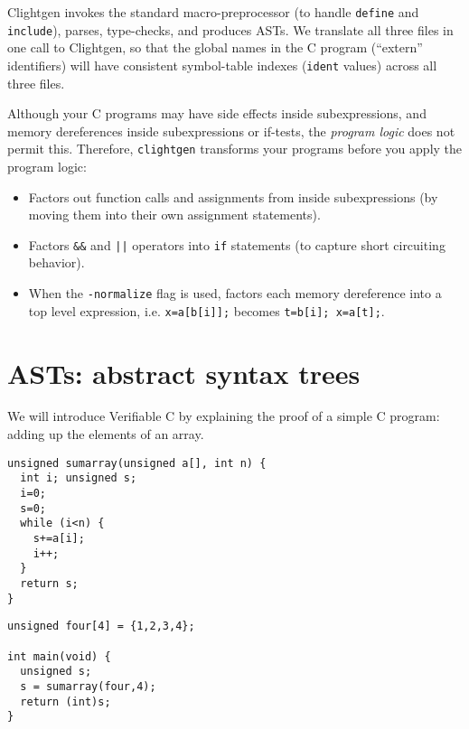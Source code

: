 \documentclass[12pt,fleqn,openany,oneside,showtrims]{memoir}
\begin{document}
Clightgen invokes the standard macro-preprocessor (to handle
\lstinline{define} and \lstinline{include}),
parses, type-checks, and produces ASTs.    We translate all
three files in one call to Clightgen, so that
the global names in the C program (``extern'' identifiers)
will have consistent symbol-table indexes (\lstinline{ident} values)
across all three files.

Although your C programs may have side effects inside subexpressions,
and memory dereferences inside subexpressions or if-tests,
the \emph{program logic} does not permit this.  Therefore,
\lstinline{clightgen} transforms your programs
before you apply the program logic:
\begin{itemize}
\item Factors out function calls and assignments from inside subexpressions (by moving them into their own assignment statements).
\item Factors \lstinline{&&} and \lstinline{||} operators
      into \lstinline{if} statements (to capture
  short circuiting behavior).
\item When the \lstinline{-normalize} flag is used,
  factors each memory dereference into a top level expression,
  i.e. \lstinline{x=a[b[i]];} becomes \lstinline{t=b[i]; x=a[t];}.
\end{itemize}







\chapter{ASTs: abstract syntax trees}

We will introduce Verifiable C by explaining the
proof of a simple C program:  adding up the elements of an array.

\begin{minipage}{2in}
\begin{lstlisting}
unsigned sumarray(unsigned a[], int n) {
  int i; unsigned s;
  i=0;
  s=0;
  while (i<n) {
    s+=a[i];
    i++;
  }
  return s;
}
\end{lstlisting}
\end{minipage}\hfill\begin{minipage}{2in}
\begin{lstlisting}
unsigned four[4] = {1,2,3,4};

int main(void) {
  unsigned s;
  s = sumarray(four,4);
  return (int)s;
}
\end{lstlisting}
\end{minipage}
\end{document}
